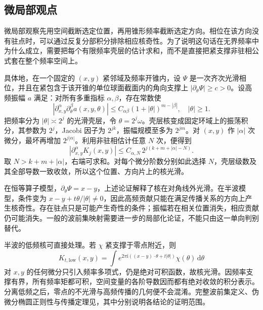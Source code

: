 \subsection{微局部观点}
\label{b2:subsec:210504}

微局部观察先用空间截断选定位置，再用锥形频率截断选定方向。相位在该方向没有驻点时，可以通过反复分部积分排除相应核奇性。为了说明这句话在无界频率中为什么成立，需要把每个有限频率壳层的估计求和，而不是直接把紧支撑非驻相公式套在整个频率空间上。

\ProseParagraphBreak
具体地，在一个固定的 \((x,y)\) 紧邻域及频率开锥内，设 \(\Psi\) 是一次齐次光滑相位，并且在紧包含于该开锥的单位球面截面内的角向支撑上
\( |\partial_\theta\Psi|\ge c>0\)。设高频振幅 \(a\) 满足：对所有多重指标 \(\alpha,\beta\)，存在常数使
\[
 |\partial_{x,y}^\alpha\partial_\theta^\beta a(x,y,\theta)|
 \le C_{\alpha\beta}(1+|\theta|)^{m-|\beta|},
 \quad |\theta|\ge1.
\]
把频率分为 \(|\theta|\asymp2^j\) 的光滑壳层，令 \(\theta=2^j\omega\)。壳层核变成固定环域上的振荡积分，其参数为 \(2^j\)，Jacobi 因子为 \(2^{jk}\)，振幅规模至多为 \(2^{jm}\)。对 \((x,y)\) 作 \(|\alpha|\) 次微分，最坏再增加 \(2^{j|\alpha|}\)。利用非驻相估计任意 \(N\) 次，便得到
\[
 |\partial_{x,y}^\alpha K_j(x,y)|
 \le C_{\alpha,N}\,2^{j(k+m+|\alpha|-N)}.
\]
取 \(N>k+m+|\alpha|\)，右端可求和。对每个微分阶数分别如此选择 \(N\)，壳层级数及其全部导数一致收敛，所以这个位置、方向片上的核光滑。

\ProseParagraphBreak
在恒等算子模型，\(\partial_\theta\Psi=x-y\)，上述论证解释了核在对角线外光滑。在半波模型，条件变为
\(x-y+t\theta/|\theta|\ne0\)，因此高频贡献只能在满足传播关系的方向上产生核奇性。存在驻点只是可能产生奇性的条件；振幅若在相关位置消失，相应贡献仍可能消失。一般的波前集映射需要进一步的局部化论证，不能只由这一单向判别替代。

\ProseParagraphBreak
半波的低频核可直接处理。若 \(\chi\) 紧支撑于零点附近，则
\[
 K_{t,\mathrm{low}}(x,y)
 =\int e^{2\pi\mathrm i((x-y)\cdot\theta+t|\theta|)}
          \chi(\theta)\,\mathrm d\theta
\]
对 \(x,y\) 的任何微分只引入频率多项式，仍是绝对可积函数，故核光滑。因频率支撑有界，所有频率矩都可积，空间变量的各阶导数因而都有绝对收敛的积分表示。分离低频之后，零点的不光滑与高频传播的几何便不会混淆。完整波前集定义、伪微分椭圆正则性与传播定理见，其中分别说明各结论的证明范围。
